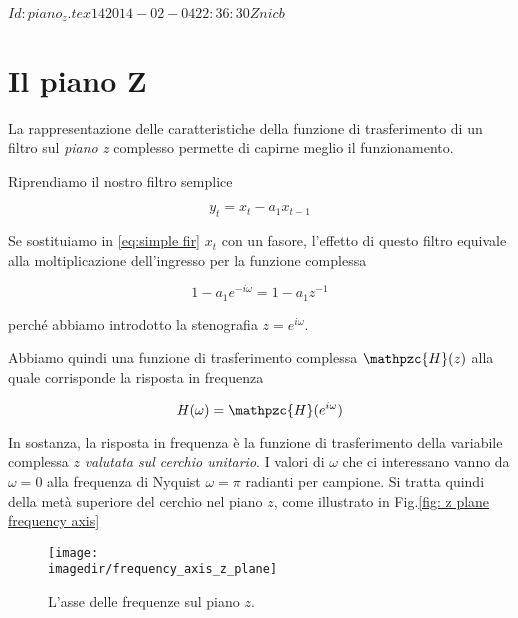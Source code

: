 %
%
\svnInfo $Id: piano_z.tex 14 2014-02-04 22:36:30Z nicb $

\section{Il piano Z\label{sec:pianoz}}

La rappresentazione delle caratteristiche della funzione di trasferimento di
un filtro sul \emph{piano z} complesso permette di capirne meglio il
funzionamento.

Riprendiamo il nostro filtro semplice

\begin{equation}\label{eq:simple fir}
	y_t = x_t - a_1 x_{t-1}
\end{equation}

Se sostituiamo in \ref{eq:simple fir} $x_t$ con un fasore, l'effetto di questo
filtro equivale alla moltiplicazione dell'ingresso per la funzione complessa

\begin{equation}\label{eq:simple transf function}
	1 - a_1 e^{-i \omega} = 1 - a_1 z^{-1}
\end{equation}

perch\'e abbiamo introdotto la stenografia $z = e^{i \omega}$.

Abbiamo quindi una funzione di trasferimento complessa  $\mathpzc{H} ( z )$
alla quale corrisponde la risposta in frequenza

\begin{equation}\label{eq: complex freq response}
		H ( \omega ) = \mathpzc{H} ( e^{i \omega} )
\end{equation}

In sostanza, la risposta in frequenza \`e la funzione di trasferimento della
variabile complessa $z$ \emph{valutata sul cerchio unitario}.
I valori di $\omega$ che ci interessano vanno da $\omega = 0$ alla frequenza
di Nyquist $\omega = \pi$ radianti per campione. Si tratta quindi della met\`a
superiore del cerchio nel piano $z$, come illustrato in Fig.\vref{fig: z plane frequency axis}
\begin{figure}[htp]
\begin{center}
	\texttt{[image: \\imagedir/frequency\_axis\_z\_plane]}
	\caption{L'asse delle frequenze sul piano $z$.\label{fig: z plane frequency axis}}
\end{center}
\end{figure}

